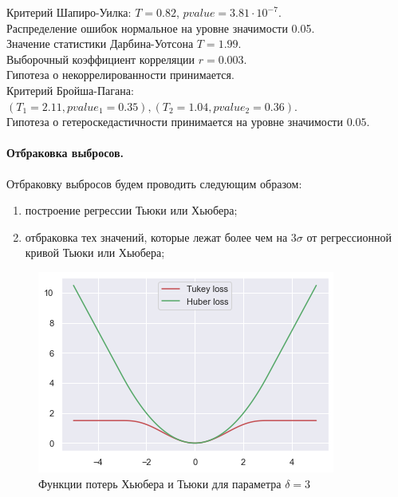 \documentclass[a4paper,12pt]{article}
\begin{document}
Критерий Шапиро-Уилка: $T = 0.82$, $pvalue = 3.81\cdot10^{-7}$.\\
Распределение ошибок нормальное на уровне значимости 0.05.\\

Значение статистики Дарбина-Уотсона $T = 1.99$.\\
Выборочный коэффициент корреляции $r = 0.003$.\\
Гипотеза о некоррелированности принимается.\\

Критерий Бройша-Пагана: $(T_1 = 2.11, pvalue_1 = 0.35), (T_2 = 1.04, pvalue_2 = 0.36)$.\\
Гипотеза о гетероскедастичности принимается на уровне значимости $0.05$.\\


\paragraph{Отбраковка выбросов.\\}

Отбраковку выбросов будем проводить следующим образом:
\begin{enumerate}
    \item построение регрессии Тьюки или Хьюбера;
    \item отбраковка тех значений, которые лежат более чем на $3\sigma$ от регрессионной кривой Тьюки или Хьюбера;
\end{enumerate}

\begin{figure}
    \vspace{-2ex}
    \includegraphics[width=\linewidth]{src/img/Тьюки_и_Хьюбер.png}
    \caption{Функции потерь Хьюбера и Тьюки для параметра $\delta=3$}
\end{figure}
\end{document}
